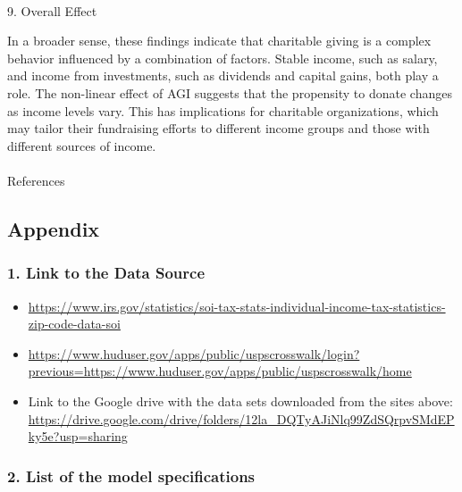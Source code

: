 \documentclass[
  letterpaper,
  DIV=11,
  numbers=noendperiod]{scrartcl}
\makeatletter
\let\oldparagraph\paragraph
\renewcommand{\paragraph}{
    \@ifstar
      \xxxParagraphStar
      \xxxParagraphNoStar
  }
\newcommand{\xxxParagraphStar}[1]{\oldparagraph*{#1}\mbox{}}
\newcommand{\xxxParagraphNoStar}[1]{\oldparagraph{#1}\mbox{}}
\newlength{\cslhangindent}
\newenvironment{CSLReferences}[2] %
 {\begin{list}{}{%
  \setlength{\itemindent}{0pt}
  \setlength{\leftmargin}{0pt}
  \setlength{\parsep}{0pt}
  \ifodd #1
   \setlength{\leftmargin}{\cslhangindent}
   \setlength{\itemindent}{-1\cslhangindent}
  \fi
  \setlength{\itemsep}{#2\baselineskip}}}
 {\end{list}}
\makeatother
\begin{document}
\paragraph{9. Overall Effect}\label{overall-effect}

In a broader sense, these findings indicate that charitable giving is a
complex behavior influenced by a combination of factors. Stable income,
such as salary, and income from investments, such as dividends and
capital gains, both play a role. The non-linear effect of AGI suggests
that the propensity to donate changes as income levels vary. This has
implications for charitable organizations, which may tailor their
fundraising efforts to different income groups and those with different
sources of income.

\paragraph{References}\label{references}

\label{refs}
\begin{CSLReferences}{0}{1}
\end{CSLReferences}

\newpage

\subsection{Appendix}\label{appendix}

\subsubsection{1. Link to the Data
Source}\label{link-to-the-data-source}

\begin{itemize}
\item
  \url{https://www.irs.gov/statistics/soi-tax-stats-individual-income-tax-statistics-zip-code-data-soi}
\item
  \url{https://www.huduser.gov/apps/public/uspscrosswalk/login?previous=https://www.huduser.gov/apps/public/uspscrosswalk/home}
\item
  Link to the Google drive with the data sets downloaded from the sites
  above:
  \url{https://drive.google.com/drive/folders/12la_DQTyAJiNlq99ZdSQrpvSMdEPky5e?usp=sharing}
\end{itemize}

\subsubsection{2. List of the model
specifications}\label{list-of-the-model-specifications}
\end{document}
